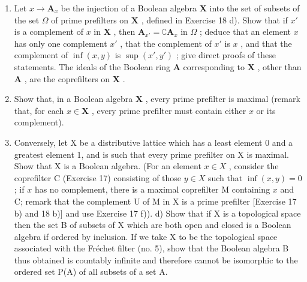 \begin{enumerate}
\def\labelenumi{\alph{enumi})}
\item
  Let \(x \to \mathbf{A}_x\) be the injection of a Boolean algebra \(\mathbf{X}\) into the set of subsets of the set \(\Omega\) of prime prefilters on \(\mathbf{X}\) , defined in Exercise 18 d). Show that if \(x'\) is a complement of \(x\) in \(\mathbf{X}\) , then \(\mathbf{A}_{x'} = \complement \mathbf{A}_x\) in \(\Omega\) ; deduce that an element \(x\) has only one complement \(x'\) , that the complement of \(x'\) is \(x\) , and that the complement of \(\inf (x, y)\) is \(\sup (x', y')\) ; give direct proofs of these statements. The ideals of the Boolean ring \(\mathbf{A}\) corresponding to \(\mathbf{X}\) , other than \(\mathbf{A}\) , are the coprefilters on \(\mathbf{X}\) .
\item
  Show that, in a Boolean algebra \(\mathbf{X}\) , every prime prefilter is maximal (remark that, for each \(x \in \mathbf{X}\) , every prime prefilter must contain either \(x\) or its complement).
\item
  Conversely, let X be a distributive lattice which has a least element 0 and a greatest element 1, and is such that every prime prefilter on X is maximal. Show that X is a Boolean algebra. (For an element \(x \in X\) , consider the coprefilter C (Exercise 17) consisting of those \(y \in X\) such that \(\inf(x, y) = 0\) ; if \(x\) has no complement, there is a maximal coprefilter M containing \(x\) and C; remark that the complement U of M in X is a prime prefilter {[}Exercise 17 b) and 18 b){]} and use Exercise 17 f)). d) Show that if X is a topological space then the set B of subsets of X which are both open and closed is a Boolean algebra if ordered by inclusion. If we take X to be the topological space associated with the Fréchet filter (no. 5), show that the Boolean algebra B thus obtained is countably infinite and therefore cannot be isomorphic to the ordered set P(A) of all subsets of a set A.
\end{enumerate}
\relax{}
